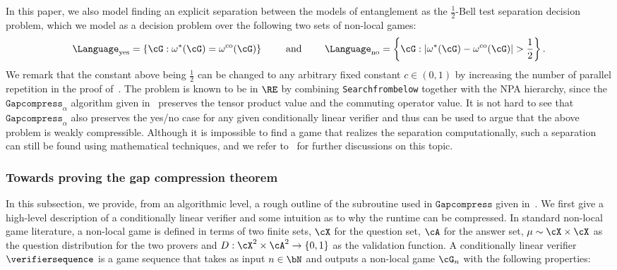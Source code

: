 In this paper, we also model finding an explicit separation between the models of entanglement as the $\frac{1}{2}$-Bell test separation decision problem, which we model as a decision problem over the following two sets of non-local games:
\begin{equation*}
	\Language_{\text{yes}} = \left\{ \cG: \omega^{*}(\cG) =  \omega^{\mathrm{co}}(\cG) \right\} \qquad \text{ and } \qquad	\Language_{\text{no}} = \left\{ \cG: | \omega^{*}(\cG) - \omega^{\mathrm{co}}(\cG) | > \frac{1}{2} \right\}. 
\end{equation*} 
We remark that the constant above being $\frac{1}{2}$ can be changed to any arbitrary fixed constant $c \in (0,1)$ by increasing the number of parallel repetition in the proof of~. The problem is known to be in $\RE$ by combining \texttt{Searchfrombelow} together with the NPA hierarchy, since the $\texttt{Gapcompress}_{\alpha}$ algorithm given in~ preserves the tensor product value and the commuting operator value. It is not hard to see that $\texttt{Gapcompress}_{\alpha}$ also preserves the yes/no case for any given conditionally linear verifier and thus can be used to argue that the above problem is weakly compressible. Although it is impossible to find a game that realizes the separation computationally, such a separation can still be found using mathematical techniques, and we refer to~ for further discussions on this topic. 


\subsubsection{Towards proving the gap compression theorem}
 In this subsection, we provide, from an algorithmic level, a rough outline of the subroutine used in $\texttt{Gapcompress}$ given in~. We first give a high-level description of a conditionally linear verifier and some intuition as to why the runtime can be compressed. In standard non-local game literature, a non-local game is defined in terms of two finite sets, $\cX$ for the question set, $\cA$ for the answer set, $\mu \sim \cX \times \cX$ as the question distribution for the two provers and $D: \cX^2 \times \cA^2 \rightarrow \{0,1\}$ as the validation function. A conditionally linear verifier $\verifiersequence$ is a game sequence that takes as input $n \in \bN$ and outputs a non-local game $\cG_n$ with the following properties:

